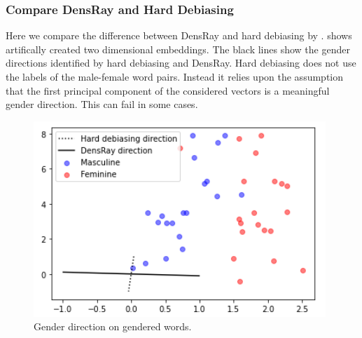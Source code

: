 \subsubsection{Compare DensRay and Hard Debiasing}
Here we compare the difference between DensRay and hard debiasing by \citep{mu2018all}.  shows artifically created two dimensional embeddings. The black lines show the gender directions identified by hard debiasing and DensRay. Hard debiasing does not use the labels of the male-female word pairs. Instead it relies upon the assumption that the first principal component of the considered vectors is a meaningful gender direction. This can fail in some cases. 
\begin{figure}[h]
	\centering
	\includegraphics[width=0.9\linewidth]{example.png}
	\caption{Gender direction on gendered words. }
\end{figure}
